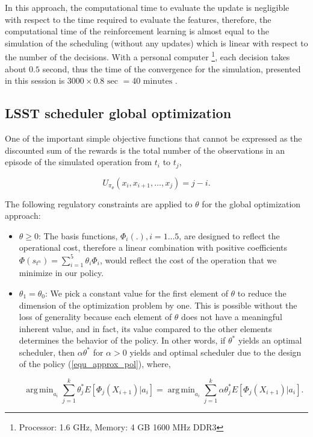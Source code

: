 \documentclass[12pt]{aastex62}
\theoremstyle{definition}
\DeclareMathOperator*{\argmin}{arg\,min}
\begin{document}
In this approach, the computational time to evaluate the update is negligible with respect to the time required to evaluate the features, therefore, the computational time of the reinforcement learning is almost equal to the simulation of the scheduling (without any updates) which is linear with respect to the number of the decisions. With a personal computer \footnote{Processor: 1.6 GHz, Memory: 4 GB 1600 MHz DDR3}, each decision takes about $0.5$ second, thus the time of the convergence for the simulation, presented in this session is $3000\times 0.8 \text{ sec } = 40 \text{ minutes }$.

\subsection{LSST scheduler global optimization}

One of the important simple objective functions that cannot be expressed as the discounted sum of the rewards is the total number of the observations in an episode of the simulated operation from $t_i$ to $t_j$,

\begin{equation}\label{equ_lsst_ede}
U_{\pi_{\theta}}(x_i, x_{i+1}, \dots, x_j) = j - i.
\end{equation}

The following regulatory constraints are applied to $\theta$ for the global optimization approach:

\begin{itemize}
\item $\theta \geq 0$: The basis functions, $\Phi_i(.), i = 1\dots 5$, are designed to reflect the operational cost, therefore a linear combination with positive coefficients $\Phi(s_{t^n})= \sum_{i=1}^5 \theta_i \Phi_i$, would reflect the cost of the operation that we minimize in our policy.

\item $\theta_1 =\theta_0$: We pick a constant value for the first element of $\theta$ to reduce the dimension of the optimization problem by one. This is possible without the loss of generality because each element of $\theta$ does not have a meaningful inherent value, and in fact, its value compared to the other elements determines the behavior of the policy. In other words, if $\theta^*$ yields an optimal scheduler, then $\alpha \theta^*$ for $\alpha > 0$ yields and optimal scheduler due to the design of the policy (\ref{equ_approx_pol}), where, 

\begin{equation*}
\argmin_{a_{i}} \sum_{j=1}^k \theta^*_j E[\Phi_j(X_{i+1}) | a_{i}] = \argmin_{a_{i}} \sum_{j=1}^k \alpha \theta^*_j E[\Phi_j(X_{i+1}) | a_{i}].
\end{equation*}
\end{itemize}
\end{document}
